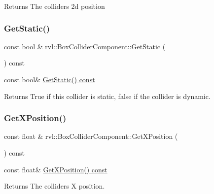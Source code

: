 \begin{DoxyReturn}{Returns}
The colliders 2d position 
\end{DoxyReturn}
\mbox{\label{classrvl_1_1_box_collider_component_accc54a2c6d9472dd85f27876e0bacb18}} 
\subsubsection{\texorpdfstring{Get\+Static()}{GetStatic()}}
{\footnotesize\ttfamily const bool \& rvl\+::\+Box\+Collider\+Component\+::\+Get\+Static (\begin{DoxyParamCaption}{ }\end{DoxyParamCaption}) const}



const bool\& \hyperlink{classrvl_1_1_box_collider_component_accc54a2c6d9472dd85f27876e0bacb18}{Get\+Static() const} 

\begin{DoxyReturn}{Returns}
True if this collider is static, false if the collider is dynamic. 
\end{DoxyReturn}
\mbox{\label{classrvl_1_1_box_collider_component_a0fd7571e3de2e8cf01eb7149c5e507da}} 
\subsubsection{\texorpdfstring{Get\+X\+Position()}{GetXPosition()}}
{\footnotesize\ttfamily const float \& rvl\+::\+Box\+Collider\+Component\+::\+Get\+X\+Position (\begin{DoxyParamCaption}{ }\end{DoxyParamCaption}) const}



const float\& \hyperlink{classrvl_1_1_box_collider_component_a0fd7571e3de2e8cf01eb7149c5e507da}{Get\+X\+Position() const} 

\begin{DoxyReturn}{Returns}
The colliders X position. 
\end{DoxyReturn}
\mbox{\label{classrvl_1_1_box_collider_component_ab21aca89c253235b2f33867c2b411467}} 
